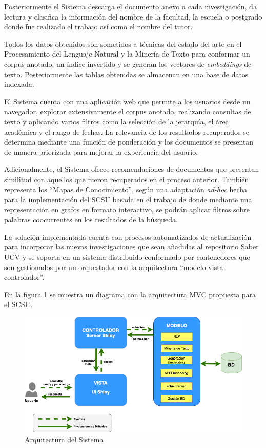 \documentclass[
  12pt,
  openany]{book}
\begin{document}
Posteriormente el Sistema descarga el documento anexo a cada investigación, da lectura y clasifica la información del nombre de la facultad, la escuela o postgrado donde fue realizado el trabajo así como el nombre del tutor.

Todos los datos obtenidos son sometidos a técnicas del estado del arte en el Procesamiento del Lenguaje Natural y la Minería de Texto para conformar un corpus anotado, un índice invertido y se generan los vectores de \emph{embeddings} de texto. Posteriormente las tablas obtenidas se almacenan en una base de datos indexada.

El Sistema cuenta con una aplicación web que permite a los usuarios desde un navegador, explorar extensivamente el corpus anotado, realizando consultas de texto y aplicando varios filtros como la selección de la jerarquía, el área académica y el rango de fechas. La relevancia de los resultados recuperados se determina mediante una función de ponderación y los documentos se presentan de manera priorizada para mejorar la experiencia del usuario.

Adicionalmente, el Sistema ofrece recomendaciones de documentos que presentan similitud con aquellos que fueron recuperados en el proceso anterior. También representa los ``Mapas de Conocimiento'', según una adaptación \emph{ad-hoc} hecha para la implementación del SCSU basada en el trabajo de \citep{dueñas2011} donde mediante una representación en grafos en formato interactivo, se podrán aplicar filtros sobre palabras coocurrentes en los resultados de la búsqueda.

La solución implementada cuenta con procesos automatizados de actualización para incorporar las nuevas investigaciones que sean añadidas al repositorio Saber UCV y se soporta en un sistema distribuido conformado por contenedores que son gestionados por un orquestador con la arquitectura ``modelo-vista-controlador''.

En la figura \ref{fig:arquitecturasri} se muestra un diagrama con la arquitectura MVC propuesta para el SCSU.

\begin{figure}

{\centering \includegraphics[width=0.9\linewidth]{images/05-desarrollo/MVC9} 

}

\caption{Arquitectura del Sistema}\label{fig:arquitecturasri}
\end{figure}
\end{document}
